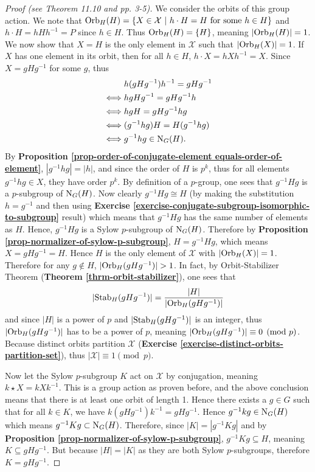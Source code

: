 \begin{proof}[Proof (see \cite{humphreys_1996} Theorem 11.10 and \cite{mann_2011} pp. 3-5)]
    We consider the orbits of this group action. We note that $\mathrm{Orb}_{H}(H) = \{X \in \mathcal{X} \ | \  h \cdot H = H \text{ for some } h \in H\}$ and $h\cdot H = hHh^{-1} = P$ since $h \in H$. Thus $\mathrm{Orb}_{H}(H) = \{H\}$, meaning $|\mathrm{Orb}_{H}(H)| = 1$. We now show that $X = H$ is the only element in $\mathcal{X}$ such that $|\mathrm{Orb}_{H}(X)| = 1$. If $X$ has one element in its orbit, then for all $h \in H$, $h\cdot X = hXh^{-1} = X$. Since $X = gHg^{-1}$ for some $g$, thus
    \begin{align*}
        &h(gHg^{-1})h^{-1} = gHg^{-1}\\
        \iff&hgHg^{-1} = gHg^{-1}h\\
        \iff&hgH = gHg^{-1}hg\\
        \iff&(g^{-1}hg)H = H(g^{-1}hg)\\
        \iff&g^{-1}hg \in \mathrm{N}_{G}(H).
    \end{align*}
    By \textbf{Proposition \ref{prop-order-of-conjugate-element equals-order-of-element}}, $|g^{-1}hg| = |h|$, and since the order of $H$ is $p^k$, thus for all elements $g^{-1}hg \in X$, they have order $p^k$. By definition of a $p$-group, one sees that $g^{-1}Hg$ is a $p$-subgroup of $\mathrm{N}_{G}(H)$. Now clearly $g^{-1}Hg \cong H$ (by making the substitution $h = g^{-1}$ and then using \textbf{Exercise \ref{exercise-conjugate-subgroup-isomorphic-to-subgroup}} result) which means that $g^{-1}Hg$ has the same number of elements as $H$. Hence, $g^{-1}Hg$ is a Sylow $p$-subgroup of $\mathrm{N}_{G}(H)$. Therefore by \textbf{Proposition \ref{prop-normalizer-of-sylow-p-subgroup}},  $H = g^{-1}Hg$, which means $X = gHg^{-1} = H$. Hence $H$ is the only element of $\mathcal{X}$ with $|\mathrm{Orb}_{H}(X)| = 1$. Therefore for any $g \notin H$, $|\mathrm{Orb}_{H}(gHg^{-1})| > 1$. In fact, by Orbit-Stabilizer Theorem (\textbf{Theorem \ref{thrm-orbit-stabilizer}}), one sees that
    \[
        |\mathrm{Stab}_{H}(gHg^{-1})| = \frac{|H|}{|\mathrm{Orb}_{H}(gHg^{-1})|}
    \]
    and since $|H|$ is a power of $p$ and $|\mathrm{Stab}_{H}(gHg^{-1})|$ is an integer, thus $|\mathrm{Orb}_{H}(gHg^{-1})|$ has to be a power of $p$, meaning $|\mathrm{Orb}_{H}(gHg^{-1})| \equiv 0 \pmod p$. Because distinct orbits partition $\mathcal{X}$ (\textbf{Exercise \ref{exercise-distinct-orbits-partition-set}}), thus $|\mathcal{X}| \equiv 1 \pmod p$.

    Now let the Sylow $p$-subgroup $K$ act on $\mathcal{X}$ by conjugation, meaning $k \star X = kXk^{-1}$. This is a group action as proven before, and the above conclusion means that there is at least one orbit of length 1. Hence there exists a $g \in G$ such that for all $k \in K$, we have $k(gHg^{-1})k^{-1} = gHg^{-1}$. Hence $g^{-1}kg \in \mathrm{N}_{G}(H)$ which means $g^{-1}Kg \subset \mathrm{N}_{G}(H)$. Therefore, since $|K| = |g^{-1}Kg|$ and by \textbf{Proposition \ref{prop-normalizer-of-sylow-p-subgroup}}, $g^{-1}Kg \subseteq H$, meaning $K \subseteq gHg^{-1}$. But because $|H| = |K|$ as they are both Sylow $p$-subgroups, therefore $K = gHg^{-1}$.
\end{proof}
